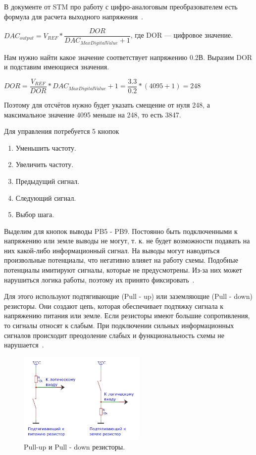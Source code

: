 	В документе от STM про работу с цифро-аналоговым преобразователем есть формула для расчета выходного напряжения~\cite{an3126}.
	
	$DAC_{output} = V_{REF}*\dfrac{DOR}{DAC_{MaxDigitalValue} + 1}$, где DOR --- цифровое значение.
	
	Нам нужно найти какое значение соответствует напряжению 0.2В. Выразим DOR и подставим имеющиеся значения.
	
	$DOR = \dfrac{V_{REF}}{DOR}*DAC_{MaxDigitalValue} + 1 = \dfrac{3.3}{0.2}*(4095+1) = 248$
	
	Поэтому для отсчётов нужно будет указать смещение от нуля 248, а максимальное значение 4095 меньше на 248, то есть 3847. 
	
	Для управления потребуется 5 кнопок
	\begin{enumerate}
		\item Уменьшить частоту.
		\item Увеличить частоту.
		\item Предыдущий сигнал.
		\item Следующий сигнал.
		\item Выбор шага.
	\end{enumerate}
	
	Выделим для кнопок выводы PB5 - PB9. Постоянно быть подключенными к напряжению или земле выводы не могут, т. к. не будет возможности подавать на них какой-либо информационный сигнал. На выводы могут наводиться произвольные потенциалы, что негативно влияет на работу схемы. Подобные потенциалы имитируют сигналы, которые не предусмотрены. Из-за них может нарушиться логика работы, поэтому их принято фиксировать~\cite{schemat}. 
	
	Для этого используют подтягивающие (Pull - up) или заземляющие (Pull - down) резисторы. Они создают цепь, которая обеспечивает подтяжку сигнала к напряжению питания или земле. Если резисторы имеют большие сопротивления, то сигналы относят к слабым. При подключении сильных информационных сигналов происходит преодоление слабых и функциональность схемы не нарушается~\cite{butres}.
	
	\begin{figure}[H]
    \centering
    \includegraphics[width=0.55\textwidth]{../image/res.png}
    \caption{Pull-up и Pull - down резисторы.}
	\end{figure}
	
